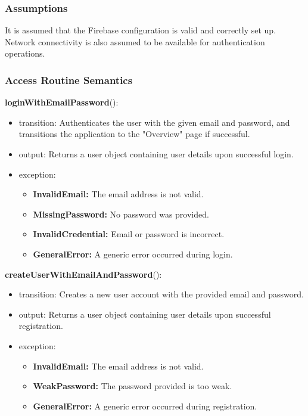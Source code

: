 \documentclass[12pt, titlepage]{article}
\begin{document}
\subsubsection{Assumptions}

It is assumed that the Firebase configuration is valid and correctly set up. Network connectivity is also assumed to be available for authentication operations.

\subsubsection{Access Routine Semantics}

\noindent \textbf{loginWithEmailPassword}():
\begin{itemize}
\item transition: Authenticates the user with the given email and password, and transitions the application to the "Overview" page if successful.
\item output: Returns a user object containing user details upon successful login.
\item exception: 
    \begin{itemize}
        \item \textbf{InvalidEmail:} The email address is not valid.
        \item \textbf{MissingPassword:} No password was provided.
        \item \textbf{InvalidCredential:} Email or password is incorrect.
        \item \textbf{GeneralError:} A generic error occurred during login.
    \end{itemize}
\end{itemize}

\noindent \textbf{createUserWithEmailAndPassword}():
\begin{itemize}
\item transition: Creates a new user account with the provided email and password.
\item output: Returns a user object containing user details upon successful registration.
\item exception: 
    \begin{itemize}
        \item \textbf{InvalidEmail:} The email address is not valid.
        \item \textbf{WeakPassword:} The password provided is too weak.
        \item \textbf{GeneralError:} A generic error occurred during registration.
    \end{itemize}
\end{itemize}
\end{document}

